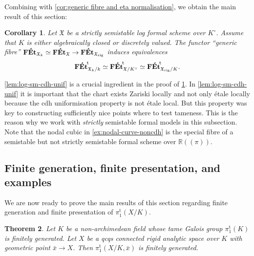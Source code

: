 \documentclass[a4paper,twoside,11pt,reqno]{amsart}
\renewcommand{\mathbb}{\mathds}
\newcommand{\fX}{{\mathfrak{X}}}
\newcommand{\cat}[1]{\mathbf{#1}}
\newcommand{\FEt}{\cat{F\acute{E}t}}
\newcommand{\pitame}{\pi_1^{\mathrm{t}}}
\newcommand{\FEtt}{{\cat{F\acute{E}t}}^{\!\mathrm{t}}}
\newcommand{\rig}{{\rm rig}}
\newtheorem{thm}{Theorem}[subsection]
\newtheorem{cor}[thm]{Corollary}
\theoremstyle{definition}
\numberwithin{equation}{subsection}
\begin{document}
Combining with \cref{cor:generic fibre and eta normalisation}, we obtain the main result of this section:

\begin{cor} \label{cor:Abhy-infty-equiv}
    Let $\fX$ be a strictly semistable log formal scheme over $K^\circ$. Assume that $K$ is either algebraically closed or discretely valued. 
    The functor ``generic fibre'' 
    $\FEt_{\fX_k}\simeq \FEt_\fX\to \FEt_{\fX_\rig}$ induces equivalences
    \[
        \FEtt_{\fX_k/k} \simeq \FEtt_{\fX/K^\circ} \simeq \FEtt_{\fX_\rig/K}.
    \]
\end{cor}

\cref{lem:log-sm-cdh-unif} is a crucial ingredient in the proof of \cref{cor:Abhy-infty-equiv}. In \cref{lem:log-sm-cdh-unif} it is important that the chart exists Zariski locally and not only étale locally because the cdh uniformisation property is not étale local.
But this property was key to constructing sufficiently nice points where to test tameness.
This is the reason why we work with \emph{strictly} semistable formal models in this subsection. Note that the nodal cubic in \cref{ex:nodal-curve-noncdh} is the special fibre of a semistable but not strictly semistable formal scheme over $\mathbb{R}(\!(\pi)\!)$.

\subsection{Finite generation, finite presentation, and examples}
\label{ss:tamepi1-rig-fgfp}

We are now ready to prove the main results of this section regarding finite generation and finite presentation of $\pitame(X/K)$. 

\begin{thm} \label{thm:fg-pi1-rig}
    Let $K$ be a non-archimedean field whose tame Galois group $\pitame(K)$ is finitely generated. Let $X$ be a qcqs connected rigid analytic space over $K$ with geometric point $\bar x\to X$. 
    Then $\pitame(X/K,\bar x)$ is finitely generated.
\end{thm}
\end{document}
